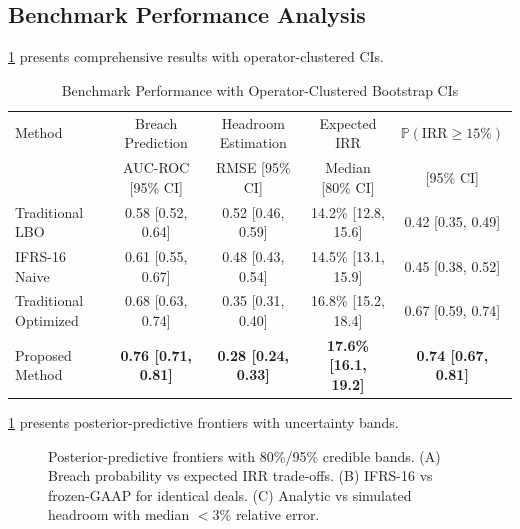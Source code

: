 \documentclass[11pt,a4paper]{article}
\newcommand{\Prob}{\mathbb{P}}
\theoremstyle{plain}
\theoremstyle{definition}
\newcommand{\Cref}[1]{\ref{#1}}
\begin{document}
\subsection{Benchmark Performance Analysis}

\Cref{tab:benchmark_results} presents comprehensive results with operator-clustered CIs.

\begin{table}[h]
\centering
\caption{Benchmark Performance with Operator-Clustered Bootstrap CIs}
\begin{tabular}{lcccc}
\toprule
Method & Breach Prediction & Headroom Estimation & Expected IRR & $\Prob(\mathrm{IRR}\ge 15\%)$ \\
& AUC-ROC [95\% CI] & RMSE [95\% CI] & Median [80\% CI] & [95\% CI] \\
\midrule
Traditional LBO & 0.58 [0.52, 0.64] & 0.52 [0.46, 0.59] & 14.2\% [12.8, 15.6] & 0.42 [0.35, 0.49] \\
IFRS-16 Naive & 0.61 [0.55, 0.67] & 0.48 [0.43, 0.54] & 14.5\% [13.1, 15.9] & 0.45 [0.38, 0.52] \\
Traditional Optimized & 0.68 [0.63, 0.74] & 0.35 [0.31, 0.40] & 16.8\% [15.2, 18.4] & 0.67 [0.59, 0.74] \\
Proposed Method & \textbf{0.76 [0.71, 0.81]} & \textbf{0.28 [0.24, 0.33]} & \textbf{17.6\% [16.1, 19.2]} & \textbf{0.74 [0.67, 0.81]} \\
\bottomrule
\end{tabular}
\label{tab:benchmark_results}
\end{table}

\Cref{fig:benchmark_performance} presents posterior-predictive frontiers with uncertainty bands.

\begin{figure}[h]
\centering
{}
\caption{Posterior-predictive frontiers with 80\%/95\% credible bands. (A) Breach probability vs expected IRR trade-offs. (B) IFRS-16 vs frozen-GAAP for identical deals. (C) Analytic vs simulated headroom with median $<3\%$ relative error.}
\label{fig:benchmark_performance}
\end{figure}
\end{document}
